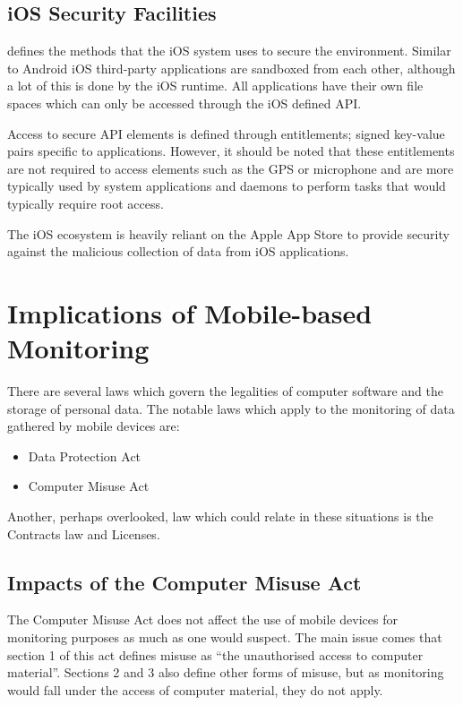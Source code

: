 \documentclass[12pt, a4paper]{article}
\begin{document}
\nocite{lockheimer2012android}

\subsection{iOS Security Facilities}
\cite{apple2012security} defines the methods that the iOS system uses to secure
the environment. Similar to Android iOS third-party applications are sandboxed 
from each other, although a lot of this is done by the iOS runtime. All
applications have their own file spaces which can only be accessed through the
iOS defined API.

Access to secure API elements is defined through entitlements; signed key-value
pairs specific to applications. However, it should be noted that these
entitlements are not required to access elements such as the GPS or microphone
and are more typically used by system applications and daemons to perform tasks
that would typically require root access.

The iOS ecosystem is heavily reliant on the Apple App
Store to provide security against the malicious
collection of data from iOS applications.





\newpage
\section{Implications of Mobile-based Monitoring}

There are several laws which govern the legalities of computer software and the
storage of personal data. The notable laws which apply to the monitoring of
data gathered by mobile devices are:

\begin{itemize}
\item Data Protection Act\cite{dpa1998}
\item Computer Misuse Act\cite{cma1990}
\end{itemize}

Another, perhaps overlooked, law which could relate in these situations is the
Contracts law and Licenses.


\subsection{Impacts of the Computer Misuse Act}
The Computer Misuse Act does not affect the use of mobile devices for monitoring
purposes as much as one would suspect. The main issue comes that section 1 of
this act defines misuse as ``the unauthorised access to computer
material''\cite{cma1990}. Sections 2 and 3 also define other forms of misuse, 
but as monitoring would fall under the access of computer material, they do not
apply.
\end{document}
